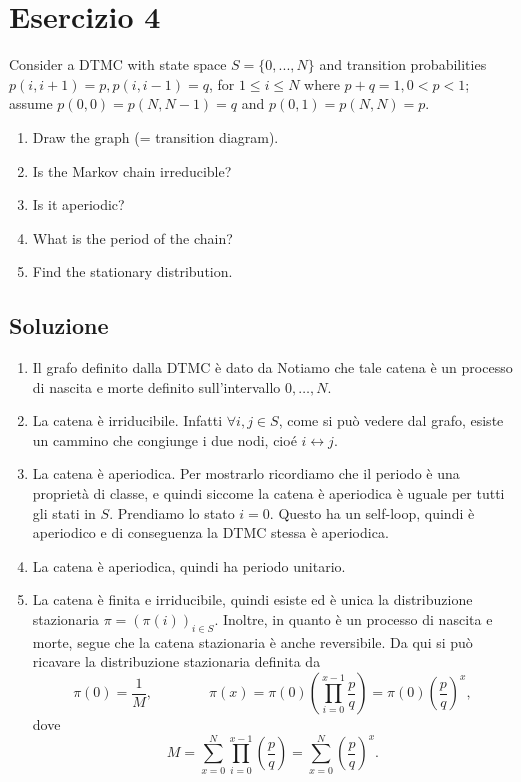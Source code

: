 \documentclass[
	12pt, %
]{fphw}
\begin{document}
\section*{Esercizio 4}

\begin{problem}
	\smallskip
	Consider a DTMC with state space $S = \{0,...,N\}$ and transition probabilities $p(i, i+1) = p, p(i, i-1) = q$, for $1 \leq i \leq N$ where $p+q =1, 0 < p < 1$; assume $p(0, 0) = p(N,N-1)= q$ and $p(0, 1) = p(N,N)= p$.
	\medskip
	\begin{enumerate}
		\item Draw the graph (= transition diagram).
		\item Is the Markov chain irreducible?
		\item Is it aperiodic?
		\item What is the period of the chain?
		\item Find the stationary distribution.
	\end{enumerate}
	\smallskip
\end{problem}


\subsection*{Soluzione}

\begin{enumerate}
	\item Il grafo definito dalla DTMC è dato da
		Notiamo che tale catena è un processo di nascita e morte definito sull'intervallo $0, \dots, N$.
	\item La catena è irriducibile. Infatti $\forall i,j \in S$, come si può vedere dal grafo, esiste un cammino che congiunge i due nodi, cioé $i \leftrightarrow j$.
	\item La catena è aperiodica. Per mostrarlo ricordiamo che il periodo è una proprietà di classe, e quindi siccome la catena è aperiodica è uguale per tutti gli stati in $S$.
		Prendiamo lo stato $i = 0$. Questo ha un self-loop, quindi è aperiodico e di conseguenza la DTMC stessa è aperiodica.
	\item La catena è aperiodica, quindi ha periodo unitario.
	\item La catena è finita e irriducibile, quindi esiste ed è unica la distribuzione stazionaria $\pi = (\pi(i))_{i \in S}$.
		Inoltre, in quanto è un processo di nascita e morte, segue che la catena stazionaria è anche reversibile.
		Da qui si può ricavare la distribuzione stazionaria definita da
		\begin{equation*}
			\pi(0) = \frac{1}{M},	\qquad\qquad	\pi(x) = \pi(0) \left( \prod_{i=0}^{x-1} \frac{p}{q} \right) = \pi(0) \left(\frac{p}{q}\right)^x,
		\end{equation*}
		dove
		\begin{equation*}
			M = \sum_{x=0}^N \prod_{i=0}^{x-1} \left( \frac{p}{q} \right) = \sum_{x=0}^N \left(\frac{p}{q}\right)^x.
		\end{equation*}
		
	
\end{enumerate}
\end{document}
